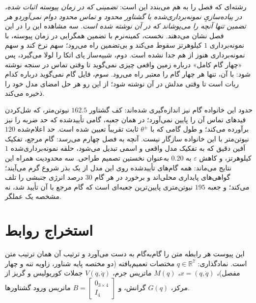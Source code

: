 \documentclass[10pt,twocolumn]{article}
\newcommand{\en}[1]{\lr{#1}}
\newcommand{\md}{\lr{\textemdash}}
\begin{document}
رشته‌ای که فصل را به هم می‌بندد این است: \emph{تضمینی که در زمان پیوسته اثبات شده، در
پیاده‌سازیِ نمونه‌برداری‌شده با گشتاور محدود و تماس محدود دوام نمی‌آورد\md{}و هر تضمین تنها
آنچه را می‌پوشاند که در آن نوشته شده است.} سه مشاهده این را در این فصل نشان می‌دهند. نخست،
\en{CLF-QP} کمینه‌نرم با تضمین همگرایی در زمان پیوسته، با نمونه‌برداری $1$ کیلوهرتز سقوط
می‌کند و \en{PD} بی‌تضمین راه می‌رود؛ سهم نرخ کند و سهم نمونه‌برداری هنوز از هم جدا نشده
است. دوم، شبیه‌ساز پای اتکا را لولا می‌گیرد، پس «چهار گام کامل» درباره زمین واقعی چیزی
نمی‌گوید تا وقتی تماس در سنجه نوشته شود: با آن، تنها \en{PD} هر چهار گام را معتبر راه می‌رود.
سوم، فایل گام نمی‌گوید درباره کدام ربات است تا وقتی مدلش در آن نوشته شود؛ از این رو هر حل
امضای مدل خود را ذخیره می‌کند.

حدود این خانواده گام نیز اندازه‌گیری شده‌اند: کف گشتاور $162.5$ نیوتن‌متر، که شل‌کردن
قیدهای تماس آن را پایین نمی‌آورد؛ در همان جعبه، گامی تأییدشده که حد ضربه را نیز برآورده می‌کند؛
و طول گامی که با $\theta^\pm$ ثابت تقریباً تعیین شده است. حد اعلام‌شده $120$ نیوتن‌متر با این
خانواده سازگار نیست. آنچه به فصل چهارم \cite{nguyen2017thesis} می‌رسد: گام مرجع، تفکیک اَفین
دقیق که به تفکیک مدل واقعی و اسمی تبدیل می‌شود، حلقه نمونه‌برداری‌شده $1$ کیلوهرتز، و کاهش
$\varepsilon$ به $0.20$ به‌عنوان نخستین تصمیم طراحی. سه محدودیت همراه این نتایج می‌ماند: همه
گام‌های تأییدشده روی این مدل از یک بذر شروع گرم می‌آیند؛ گواهی‌های پایداری محلی‌اند و برخورد
در هر گام $30$ درصد انرژی جنبشی را تلف می‌کند؛ و جعبه $195$ نیوتن‌متری پایین‌ترین جعبه‌ای
است که گام مرجع با آن تأیید شد، نه مشخصه یک عملگر.

\begin{LTR}
\printbibliography[title={مراجع}]
\end{LTR}


\onecolumn
\setcounter{section}{0}
\renewcommand{\thesection}{پ}
\renewcommand{\thesubsection}{پ-\arabic{subsection}}
\section{استخراج روابط}
\label{app:deriv}
این پیوست هر رابطه متن را گام‌به‌گام به دست می‌آورد و ترتیب آن همان ترتیب متن است.
نمادگذاری: $q\in\mathbb{R}^7$ مختصات تعمیم‌یافته (دو مختصه پایه شناور، زاویه تنه و چهار
مفصل)، $x=(q,\dot q)$، $M(q)$ ماتریس جرم، $V(q,\dot q)$ جملات کوریولیس و گریز از مرکز،
$G(q)$ گرانش، و $B=\begin{bmatrix}0_{3\times4}\\ I_4\end{bmatrix}$ ماتریس ورود گشتاورها.
\end{document}
